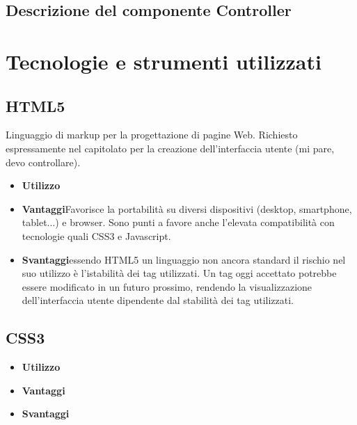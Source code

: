 \documentclass[a4paper,11pt]{article}
\begin{document}
	\subsection{Descrizione del componente Controller}
	\section{Tecnologie e strumenti utilizzati}
	\subsection{HTML5}
	Linguaggio di markup per la progettazione di pagine Web. Richiesto espressamente nel capitolato per la creazione dell'interfaccia utente (mi pare, devo controllare).
	\begin{itemize}
		\item\textbf{Utilizzo}
		\item\textbf{Vantaggi}Favorisce la portabilità su diversi dispositivi (desktop, smartphone, tablet...) e browser.
Sono punti a favore anche l'elevata compatibilità con tecnologie quali CSS3 e Javascript.
		\item\textbf{Svantaggi}essendo HTML5 un linguaggio non ancora standard il rischio nel suo utilizzo è l'istabilità dei tag utilizzati. Un tag oggi accettato potrebbe essere modificato
in un futuro prossimo, rendendo la visualizzazione dell'interfaccia utente dipendente dal stabilità dei tag utilizzati. 
	\end{itemize}
	\subsection{CSS3}
	\begin{itemize}
		\item\textbf{Utilizzo}
		\item\textbf{Vantaggi}
		\item\textbf{Svantaggi}
	\end{itemize}
\end{document}
